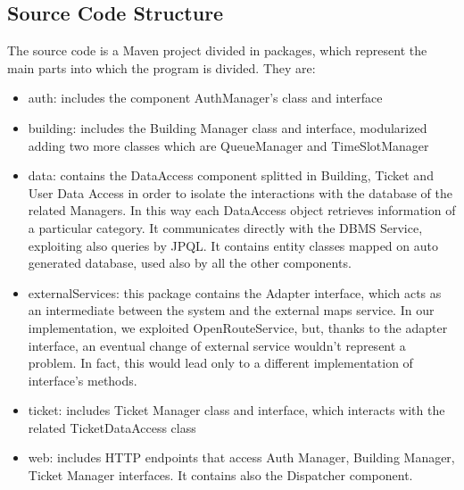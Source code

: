 \renewcommand{\thesubsection}{\Alph{subsection}}
\subsection {Source Code Structure}
The source code is a Maven project divided in packages, which represent the main parts into which the program is divided. They are:

\begin {itemize}
	\item auth: includes the component AuthManager's class and interface
	\item building: includes the Building Manager class and interface, modularized adding two more classes which are QueueManager and TimeSlotManager
	\item data: contains the DataAccess component splitted in Building, Ticket and User Data Access in order to isolate the interactions with the database of the related Managers. In this way each DataAccess object retrieves information of a particular category. It communicates directly with the DBMS Service, exploiting also queries by JPQL. It contains entity classes mapped on auto generated database, used also by all the other components. 
	\item externalServices: this package contains the Adapter interface, which acts as an intermediate between the system and the external maps service. In our implementation, we exploited OpenRouteService, but, thanks to the adapter interface, an eventual change of external service wouldn't represent a problem. In fact, this would lead only to a different implementation of interface's methods.
	\item ticket: includes Ticket Manager class and interface, which interacts with the related TicketDataAccess class
	\item web: includes HTTP endpoints that access Auth Manager, Building Manager, Ticket Manager interfaces. It contains also the Dispatcher component.
\end{itemize}